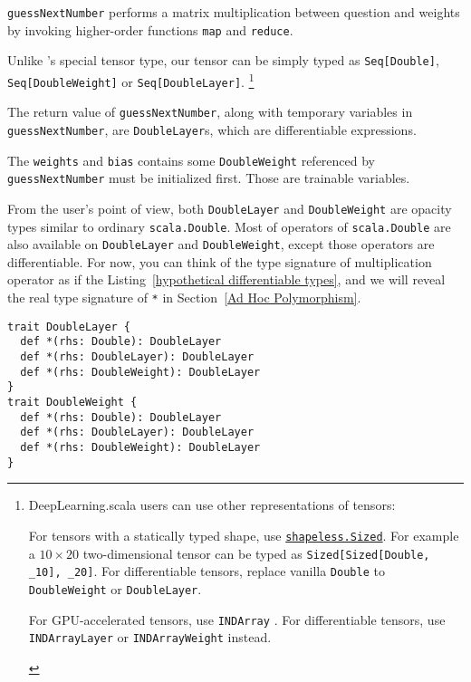 \lstinline{guessNextNumber} performs a matrix multiplication between question and weights by invoking higher-order functions \lstinline{map} and \lstinline{reduce}. 

Unlike \cite{chen2017typesafe}'s special tensor type, our tensor can be simply typed as \lstinline{Seq[Double]}, \lstinline{Seq[DoubleWeight]} or \lstinline{Seq[DoubleLayer]}.
\footnote{DeepLearning.scala users can use other representations of tensors:
\begin{enumerate*}
  \item For tensors with a statically typed shape, use \href{https://javadoc.io/page/com.chuusai/shapeless_2.11/latest/shapeless/Sized.html}{ \lstinline{shapeless.Sized}}. For example a $10\times20$ two-dimensional tensor can be typed as \lstinline{Sized[Sized[Double, _10], _20]}. For differentiable tensors, replace vanilla \lstinline{Double} to \lstinline{DoubleWeight} or \lstinline{DoubleLayer}.
  \item For GPU-accelerated tensors, use \lstinline{INDArray} \cite{skymind2017nd4j}. For differentiable tensors, use \lstinline{INDArrayLayer} or \lstinline{INDArrayWeight} instead.
\end{enumerate*}
}

The return value of \lstinline{guessNextNumber}, along with temporary variables in \lstinline{guessNextNumber}, are \lstinline{DoubleLayer}s, which are \glspl{differentiable expression}.

The \lstinline{weights} and \lstinline{bias} contains some \lstinline{DoubleWeight} referenced by \lstinline{guessNextNumber} must be initialized first. Those are \glspl{trainable variable}.

From the user's point of view, both \lstinline{DoubleLayer} and \lstinline{DoubleWeight} are opacity types similar to ordinary \lstinline{scala.Double}. Most of operators of \lstinline{scala.Double} are also available on \lstinline{DoubleLayer}  and \lstinline{DoubleWeight}, except those operators are differentiable. For now, you can think of the type signature of multiplication operator as if the Listing~\ref{hypothetical differentiable types}, and we will reveal the real type signature of \lstinline{*} in Section~\ref{Ad Hoc Polymorphism}.

\begin{lstlisting}[float={h t b p},caption={The hypothetical type signature of multiplication operator for \lstinline{DoubleLayer} and \lstinline{DoubleWeight}},label={hypothetical differentiable types}]
trait DoubleLayer {
  def *(rhs: Double): DoubleLayer
  def *(rhs: DoubleLayer): DoubleLayer
  def *(rhs: DoubleWeight): DoubleLayer
}
trait DoubleWeight {
  def *(rhs: Double): DoubleLayer
  def *(rhs: DoubleLayer): DoubleLayer
  def *(rhs: DoubleWeight): DoubleLayer
}
\end{lstlisting}

